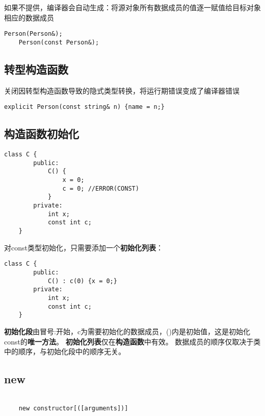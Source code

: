 如果不提供，编译器会自动生成：将源对象所有数据成员的值逐一赋值给目标对象相应的数据成员

\begin{lstlisting}[frame=shadowbox]
    Person(Person&);
    Person(const Person&);
\end{lstlisting}

\subsection{转型构造函数}

关闭因转型构造函数导致的隐式类型转换，将运行期错误变成了编译器错误

\begin{lstlisting}[frame=shadowbox]
    explicit Person(const string& n) {name = n;}    
\end{lstlisting}

\subsection{构造函数初始化}

\begin{lstlisting}[frame=shadowbox]
    class C {
        public:
            C() {
                x = 0;
                c = 0; //ERROR(CONST)
            }
        private:
            int x;
            const int c;
    }    
\end{lstlisting}

对const类型初始化，只需要添加一个\textbf{初始化列表}：

\begin{lstlisting}[frame=shadowbox]
    class C {
        public:
            C() : c(0) {x = 0;}
        private:
            int x;
            const int c;
    }    
\end{lstlisting}

\textbf{初始化段}由冒号:开始，c为需要初始化的数据成员，()内是初始值，这是初始化const的\textbf{唯一方法}。
\textbf{初始化列表}仅在\textbf{构造函数}中有效。
数据成员的顺序仅取决于类中的顺序，与初始化段中的顺序无关。


\newpage

\subsection{new}

\begin{lstlisting}[frame=shadowbox]

    new constructor[([arguments])]

\end{lstlisting}

